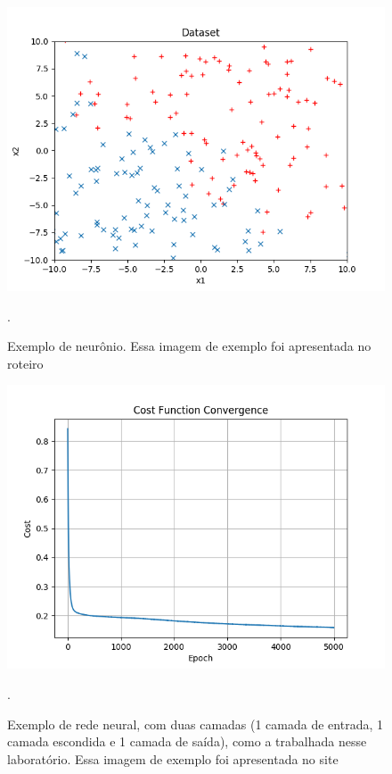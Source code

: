 \documentclass[conference]{IEEEtran}
\begin{document}
\begin{figure}[htbp]
\centering
\centerline{\includegraphics[scale=0.5]{imagens/sum_gt_zero/lambda_zero/dataset_sgz.png}}
\caption{Exemplo de neurônio. Essa imagem de exemplo foi apresentada no roteiro \cite{roteiro}}.
\label{sum_gt_zero/lambda_zero/dataset_sgz}
\end{figure}

\begin{figure}[htbp]
\centering
\centerline{\includegraphics[scale=0.5]{imagens/sum_gt_zero/lambda_zero/convergence_sgz.png}}
\caption{Exemplo de rede neural, com duas camadas (1 camada de entrada, 1 camada escondida e 1 camada de saída), como a trabalhada nesse laboratório. Essa imagem de exemplo foi apresentada no site \cite{neural-net-np}}.
\label{sum_gt_zero/lambda_zero/convergence_sgz}
\end{figure}
\end{document}
